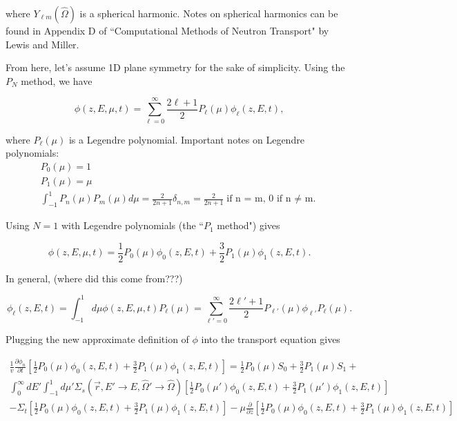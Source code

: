 \documentclass[12pt]{article}
\newcommand{\rvec}{\ensuremath{\vec{r}}}
\newcommand{\omvec}{\ensuremath{\hat{\Omega}}}
\newcommand{\sigs}{\ensuremath{\Sigma_s(\rvec,E'\rightarrow E,\omvec'\rightarrow\omvec)}}
\newcommand{\el}{\ensuremath{\ell}}
\begin{document}
where $Y_{\el m}(\omvec)$ is a spherical harmonic. Notes on spherical harmonics can be found in Appendix D
of ``Computational Methods of Neutron Transport" by Lewis and Miller.


From here, let's assume 1D plane symmetry for the sake of simplicity. Using the $P_N$ method, we have

\begin{equation*}
\phi(z,E,\mu,t) = \sum_{\el=0}^{\infty}\frac{2\el+1}{2}P_{\el}(\mu)\phi_{\el}(z,E,t),
\end{equation*}

where $P_{\ell}(\mu)$ is a Legendre polynomial. Important notes on Legendre polynomials:
\begin{gather*}
P_0(\mu) = 1 \\
P_1(\mu) = \mu \\
\int_{-1}^{1}P_n(\mu)P_m(\mu)d\mu = 
\frac{2}{2n+1}\delta_{n,m}=\frac{2}{2n+1}\text{if n = m, 0 if n $\neq$ m.}
\end{gather*}

Using $N=1$ with Legendre polynomials (the ``$P_1$ method") gives

\begin{equation*}
\phi(z,E,\mu,t) = \frac{1}{2}P_0(\mu)\phi_0(z,E,t) + \frac{3}{2}P_1(\mu)\phi_1(z,E,t).
\end{equation*}

In general, (where did this come from???)

\begin{equation*}
\phi_{\el}(z,E,t) = \int^{1}_{-1}d\mu\phi(z,E,\mu,t)P_{\el}(\mu) 
= \sum_{\el'=0}^{\infty}\frac{2\el'+1}{2}P_{\ell'}(\mu)\phi_{\el'}P_{\ell}(\mu).
\end{equation*}

Plugging the new approximate definition of $\phi$ into the transport equation gives

\begin{multline*}
\frac{1}{v}\frac{\partial\phi_n}{\partial t}\left[\frac{1}{2}P_0(\mu)\phi_0(z,E,t) + \frac{3}{2}P_1(\mu)\phi_1(z,E,t)\right] = 
\frac{1}{2}P_0(\mu)S_0 + \frac{3}{2}P_1(\mu)S_1 + \\ 
\int^{\infty}_{0}dE'\int^{1}_{-1}d\mu'\sigs\left[\frac{1}{2}P_0(\mu')\phi_0(z,E,t) + \frac{3}{2}P_1(\mu')\phi_1(z,E,t)\right] \\
- \Sigma_t\left[\frac{1}{2}P_0(\mu)\phi_0(z,E,t) + \frac{3}{2}P_1(\mu)\phi_1(z,E,t)\right]
- \mu\frac{\partial}{\partial z}\left[\frac{1}{2}P_0(\mu)\phi_0(z,E,t) + \frac{3}{2}P_1(\mu)\phi_1(z,E,t)\right]
\end{multline*}
\end{document}
